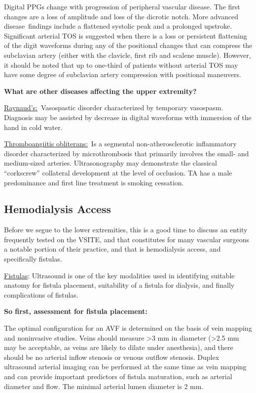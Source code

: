 \documentclass[
]{book}
\begin{document}
Digital PPGs change with progression of peripheral vascular disease. The
first changes are a loss of amplitude and loss of the dicrotic notch.
More advanced disease~findings include a flattened systolic peak and a
prolonged upstroke. Significant arterial TOS is suggested when there is
a loss or persistent flattening of the digit waveforms during any of the
positional changes that can compress the subclavian artery (either with
the clavicle, first rib and scalene muscle). However, it should be noted
that up to one-third of patients without arterial TOS may have some
degree of subclavian artery compression with positional maneuvers.

\textbf{What are other diseases affecting the upper extremity?}

\uline{Raynaud's:}~Vasospastic disorder characterized by temporary
vasospasm. Diagnosis may be assisted by decrease in digital waveforms
with immersion of the hand in cold water.

\uline{Thromboangiitis obliterans:}~Is a segmental
non-atherosclerotic inflammatory disorder characterized by
microthrombosis that primarily involves the small- and medium-sized
arteries. Ultrasonography may demonstrate the classical ``corkscrew''
collateral development at the level of occlusion. TA has a male
predominance and first line treatment is smoking cessation.

\hypertarget{hemodialysis-access}{%
\subsection{Hemodialysis Access}\label{hemodialysis-access}}

Before we segue to the lower extremities, this is a good time to discuss
an entity frequently tested on the VSITE, and that constitutes for many
vascular surgeons a notable portion of their practice, and that is
hemodialysis access, and specifically fistulas.

\uline{Fistulas}: Ultrasound is one of the key modalities used in
identifying suitable anatomy for fistula placement, suitability of a
fistula for dialysis, and finally complications of fistulas.

\textbf{So first, assessment for fistula placement:}

The optimal configuration for an AVF is determined on the basis of vein
mapping and noninvasive studies. Veins should measure \textgreater3 mm in diameter
(\textgreater2.5 mm may be acceptable, as veins are likely to dilate under
anesthesia), and there should be no arterial inflow stenosis or venous
outflow stenosis. Duplex ultrasound arterial imaging can be performed at
the same time as vein mapping and can provide important predictors of
fistula maturation, such as arterial diameter and flow. The minimal
arterial lumen diameter is 2 mm.
\end{document}
